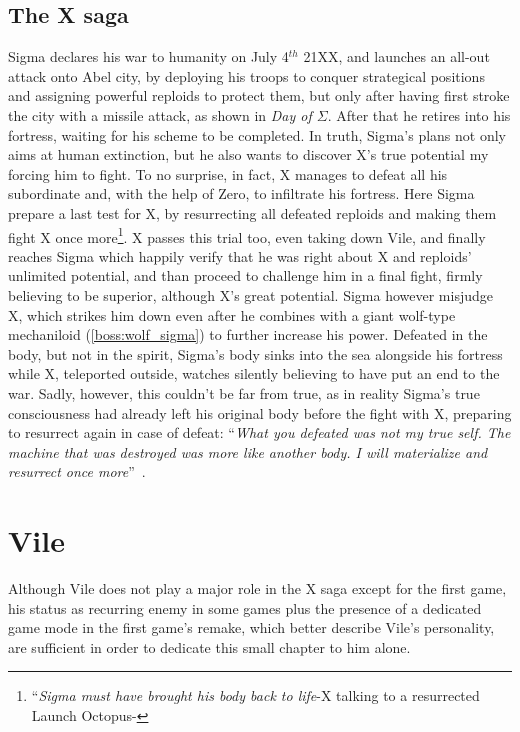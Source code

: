 \section{The X saga}
Sigma declares his war to humanity on July 4$^{th}$ 21XX, and launches an all-out attack onto Abel city, by deploying his troops to conquer strategical positions and assigning powerful reploids to protect them, but only after having first stroke the city  with a missile attack, as shown in \textit{Day of $\Sigma$}. After that he retires
into his fortress, waiting for his scheme to be completed. In truth, Sigma's plans not only aims at human extinction, but he also wants to discover X's true potential my forcing him to fight. To no surprise, in fact, X manages to defeat all his subordinate and, with the help of Zero, to infiltrate his fortress. Here Sigma prepare a last test for X, by resurrecting all defeated reploids and making them fight X once more\footnote{``\textit{Sigma must have brought his body back to life}-X talking to a resurrected Launch Octopus-\cite{wiki:MM_MHX_script}}. X passes this trial too, even taking down Vile, and finally reaches Sigma which happily verify that he was right about X and reploids' unlimited potential, and than proceed to challenge him in a final fight, firmly believing to be superior, although X's great potential. Sigma however misjudge X, which strikes him down even after he combines with a giant wolf-type mechaniloid (\ref{boss:wolf_sigma}) to further increase his power. Defeated in the body, but not in the spirit, Sigma's body sinks into the sea alongside his fortress while X, teleported outside, watches silently believing to have put an end to the war. Sadly, however, this couldn't be far from true, as in reality Sigma's true consciousness had already left his original body before the fight with X, preparing to resurrect again in case of defeat: ``\textit{What you defeated was not my true self. The machine that was destroyed was more like another body. I will materialize and resurrect once more}''~\cite{wordpress:X_japanese_script}.

\chapter{Vile}\label{char:Vile}
Although Vile does not play a major role in the X saga except for the first game, his status as recurring enemy in some games plus the presence of a dedicated game mode in the first game's remake, which better describe Vile's personality, are sufficient in order to dedicate this small chapter to him alone. 

